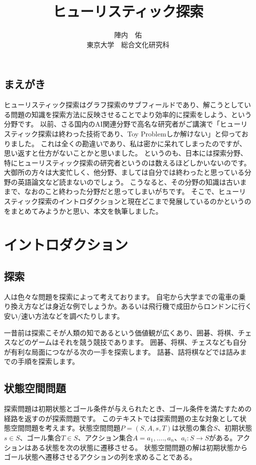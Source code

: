 \documentclass{book}
\title{ヒューリスティック探索}
\author{陣内　佑 \\
東京大学　総合文化研究科}
\begin{document}
\maketitle

\section*{まえがき}
ヒューリスティック探索はグラフ探索のサブフィールドであり、解こうとしている問題の知識を探索方法に反映させることでより効率的に探索をしよう、という分野です。
以前、さる国内のAI関連分野で高名な研究者がご講演で「ヒューリスティック探索は終わった技術であり、Toy Problemしか解けない」と仰っておりました。
これは全くの勘違いであり、私は密かに呆れてしまったのですが、思い返すと仕方がないことかと思いました。
というのも、日本には探索分野、特にヒューリスティック探索の研究者というのは数えるほどしかいないのです。
大御所の方々は大変忙しく、他分野、ましては自分では終わったと思っている分野の英語論文など読まないのでしょう。
こうなると、その分野の知識は古いままで、なおのこと終わった分野だと思ってしまいがちです。
そこで、ヒューリスティック探索のイントロダクションと現在どこまで発展しているのかというのをまとめてみようかと思い、本文を執筆しました。


\chapter{イントロダクション}
\section{探索}

人は色々な問題を探索によって考えております。
自宅から大学までの電車の乗り換え方などは身近な例でしょうか。あるいは飛行機で成田からロンドンに行く安い/速い方法などを調べたりします。

一昔前は探索こそが人類の知であるという価値観が広くあり、囲碁、将棋、チェスなどのゲームはそれを競う競技であります。
囲碁、将棋、チェスなども自分が有利な局面につながる次の一手を探索します。
詰碁、詰将棋などでは詰みまでの手順を探索します。



\section{状態空間問題}
探索問題は初期状態とゴール条件が与えられたとき、ゴール条件を満たすための経路を返すのが探索問題です。
このテキストでは探索問題の主な対象として状態空間問題を考えます。状態空間問題$P = (S, A, s, T)$は状態の集合$S$、初期状態$s \in S$、ゴール集合$T \in S$、アクション集合$A = {a_1, ....,a_n}$、$a_i : S \rightarrow S$がある。アクションはある状態を次の状態に遷移させる。
状態空間問題の解は初期状態からゴール状態へ遷移させるアクションの列を求めることである。
\end{document}
